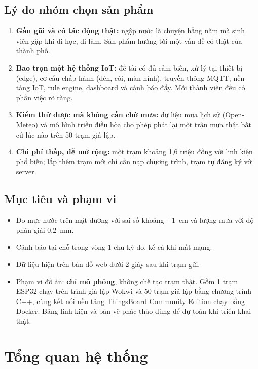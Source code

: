 \documentclass[12pt,a4paper]{article}
\begin{document}
\subsection{Lý do nhóm chọn sản phẩm}

\begin{enumerate}
  \item \textbf{Gần gũi và có tác động thật:} ngập nước là chuyện hằng năm mà sinh viên gặp khi đi học, đi làm. Sản phẩm hướng tới một vấn đề có thật của thành phố.
  \item \textbf{Bao trọn một hệ thống IoT:} đề tài có đủ cảm biến, xử lý tại thiết bị (edge), cơ cấu chấp hành (đèn, còi, màn hình), truyền thông MQTT, nền tảng IoT, rule engine, dashboard và cảnh báo đẩy. Mỗi thành viên đều có phần việc rõ ràng.
  \item \textbf{Kiểm thử được mà không cần chờ mưa:} dữ liệu mưa lịch sử (Open-Meteo) và mô hình triều điều hòa cho phép phát lại một trận mưa thật bất cứ lúc nào trên 50 trạm giả lập.
  \item \textbf{Chi phí thấp, dễ mở rộng:} một trạm khoảng 1,6 triệu đồng với linh kiện phổ biến; lắp thêm trạm mới chỉ cần nạp chương trình, trạm tự đăng ký với server.
\end{enumerate}

\subsection{Mục tiêu và phạm vi}

\begin{itemize}
  \item Đo mực nước trên mặt đường với sai số khoảng $\pm 1$~cm và lượng mưa với độ phân giải 0,2~mm.
  \item Cảnh báo tại chỗ trong vòng 1 chu kỳ đo, kể cả khi mất mạng.
  \item Dữ liệu hiện trên bản đồ web dưới 2 giây sau khi trạm gửi.
  \item Phạm vi đồ án: \textbf{chỉ mô phỏng}, không chế tạo trạm thật. Gồm 1 trạm ESP32 chạy trên trình giả lập Wokwi và 50 trạm giả lập bằng chương trình C++, cùng kết nối nền tảng ThingsBoard Community Edition chạy bằng Docker. Bảng linh kiện và bản vẽ phác thảo dùng để dự toán khi triển khai thật.
\end{itemize}

\section{Tổng quan hệ thống}
\end{document}
